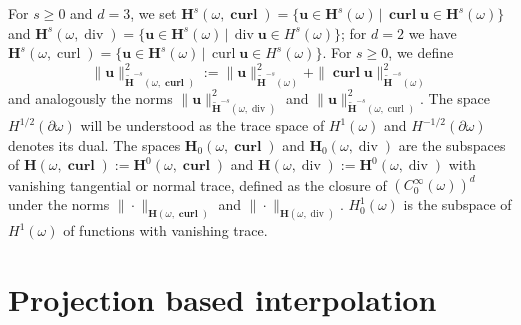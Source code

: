 \documentclass{article}
\newcommand\clr[1]{{\color{black} #1}}
\begin{document}
For $s \ge 0$ and $d = 3$, we set 
${\mathbf H}^s(\omega,\operatorname{\mathbf{curl}}) = \{{\mathbf u} \in {\mathbf H}^s(\omega)\,|\, 
\operatorname{\mathbf{curl}} {\mathbf u} \in {\mathbf H}^s(\omega)\}$ and 
${\mathbf H}^s(\omega,\operatorname{div}) = \{{\mathbf u} \in {\mathbf H}^s(\omega)\,|\, 
\operatorname{div} {\mathbf u} \in H^s(\omega)\}$; for $d = 2$ we have 
${\mathbf H}^s(\omega,\operatorname{curl}) = \{{\mathbf u} \in {\mathbf H}^s(\omega)\,|\, 
\operatorname{curl} {\mathbf u} \in H^s(\omega)\}$. For $s \ge 0$, we define 
$$
\|{\mathbf u}\|^2_{\widetilde {\mathbf H}^{-s}(\omega,\operatorname{\mathbf{curl}})} := 
\|{\mathbf u}\|^2_{\widetilde {\mathbf H}^{-s}(\omega)} + 
\|\operatorname{\mathbf{curl}} {\mathbf u}\|^2_{\widetilde{\mathbf{H}}^{-s}(\omega)}
$$ 
and analogously the norms 
$\|{\mathbf u}\|^2_{\widetilde {\mathbf H}^{-s}(\omega,\operatorname{div})}$ and 
$\|{\mathbf u}\|^2_{\widetilde {\mathbf H}^{-s}(\omega,\operatorname{curl})}$.
The space $H^{1/2}(\partial\omega)$ will be understood as the trace space of $H^1(\omega)$
and $H^{-1/2}(\partial\omega)$ denotes its dual. The spaces 
${\mathbf H}_0(\omega,\operatorname{\mathbf{curl}})$ and 
${\mathbf H}_0(\omega,\operatorname{div})$ are the subspaces of 
${\mathbf H}(\omega,\operatorname{\mathbf{curl}}):={\mathbf H}^0(\omega,\operatorname{\mathbf{curl}})$ and 
${\mathbf H}(\omega,\operatorname{div}) := {\mathbf H}^0(\omega,\operatorname{div})$ with vanishing tangential or normal trace, defined as the 
closure of $(C^\infty_0(\omega))^d$ under the norms 
$\|\cdot\|_{{\mathbf H}(\omega,\operatorname{\mathbf{curl}})}$ and 
$\|\cdot\|_{{\mathbf H}(\omega,\operatorname{div})}$. 
$H^1_0(\omega)$ is the subspace of $H^1(\omega)$ of functions with vanishing
trace. 

\section{Projection based interpolation}
\end{document}
